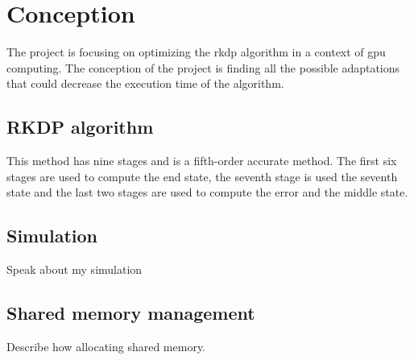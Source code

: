 \chapter{Conception}
\label{ch:conception}

The project is focusing on optimizing the \acrlong{rkdp} algorithm
in a context of \acrshort{gpu} computing.
The conception of the project is finding all the possible adaptations that could
decrease the execution time of the algorithm.

\section{RKDP algorithm}
\label{ch:conception:rkdp}

This method has nine stages and is a fifth-order accurate method.
The first six stages are used to compute the end state, the seventh stage is used
the seventh state and the last two stages are used to compute the error and the
middle state.

\section{Simulation}
\label{ch:conception:simulation}

Speak about my simulation


\section{Shared memory management}
\label{ch:conception:shared}

Describe how allocating shared memory.